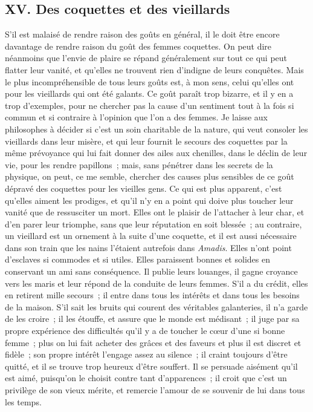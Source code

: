 \documentclass[french,twoside]{book} %
\begin{document}
\subsection[{XV. Des coquettes et des vieillards}]{XV. Des coquettes et des vieillards}
\noindent S’il est malaisé de rendre raison des goûts en général, il le doit être encore davantage de rendre raison du goût des femmes coquettes. On peut dire néanmoins que l’envie de plaire se répand généralement sur tout ce qui peut flatter leur vanité, et qu’elles ne trouvent rien d’indigne de leurs conquêtes. Mais le plus incompréhensible de tous leurs goûts est, à mon sens, celui qu’elles ont pour les vieillards qui ont été galants. Ce goût paraît trop bizarre, et il y en a trop d’exemples, pour ne chercher pas la cause d’un sentiment tout à la fois si commun et si contraire à l’opinion que l’on a des femmes. Je laisse aux philosophes à décider si c’est un soin charitable de la nature, qui veut consoler les vieillards dans leur misère, et qui leur fournit le secours des coquettes par la même prévoyance qui lui fait donner des ailes aux chenilles, dans le déclin de leur vie, pour les rendre papillons ; mais, sans pénétrer dans les secrets de la physique, on peut, ce me semble, chercher des causes plus sensibles de ce goût dépravé des coquettes pour les vieilles gens. Ce qui est plus apparent, c’est qu’elles aiment les prodiges, et qu’il n’y en a point qui doive plus toucher leur vanité que de ressusciter un mort. Elles ont le plaisir de l’attacher à leur char, et d’en parer leur triomphe, sans que leur réputation en soit blessée ; au contraire, un vieillard est un ornement à la suite d’une coquette, et il est aussi nécessaire dans son train que les nains l’étaient autrefois dans {\itshape Amadis}. Elles n’ont point d’esclaves si commodes et si utiles. Elles paraissent bonnes et solides en conservant un ami sans conséquence. Il publie leurs louanges, il gagne croyance vers les maris et leur répond de la conduite de leurs femmes. S’il a du crédit, elles en retirent mille secours ; il entre dans tous les intérêts et dans tous les besoins de la maison. S’il sait les bruits qui courent des véritables galanteries, il n’a garde de les croire ; il les étouffe, et assure que le monde est médisant ; il juge par sa propre expérience des difficultés qu’il y a de toucher le cœur d’une si bonne femme ; plus on lui fait acheter des grâces et des faveurs et plus il est discret et fidèle ; son propre intérêt l’engage assez au silence ; il craint toujours d’être quitté, et il se trouve trop heureux d’être souffert. Il se persuade aisément qu’il est aimé, puisqu’on le choisit contre tant d’apparences ; il croit que c’est un privilège de son vieux mérite, et remercie l’amour de se souvenir de lui dans tous les temps.\par
\end{document}
